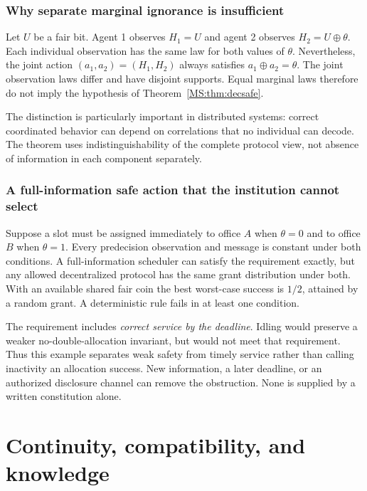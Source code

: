 \subsection{Why separate marginal ignorance is insufficient}
\begin{MScounterexample}\label{MS:ex:jointviews}
Let $U$ be a fair bit. Agent 1 observes $H_1=U$ and agent 2 observes $H_2=U\oplus\theta$. Each individual observation has the same law for both values of $\theta$. Nevertheless, the joint action $(a_1,a_2)=(H_1,H_2)$ always satisfies $a_1\oplus a_2=\theta$. The joint observation laws differ and have disjoint supports. Equal marginal laws therefore do not imply the hypothesis of Theorem~\ref{MS:thm:decsafe}.
\end{MScounterexample}

The distinction is particularly important in distributed systems: correct coordinated behavior can depend on correlations that no individual can decode. The theorem uses indistinguishability of the complete protocol view, not absence of information in each component separately.

\subsection{A full-information safe action that the institution cannot select}
Suppose a slot must be assigned immediately to office $A$ when $\theta=0$ and to office $B$ when $\theta=1$. Every predecision observation and message is constant under both conditions. A full-information scheduler can satisfy the requirement exactly, but any allowed decentralized protocol has the same grant distribution under both. With an available shared fair coin the best worst-case success is $1/2$, attained by a random grant. A deterministic rule fails in at least one condition.

The requirement includes \emph{correct service by the deadline}. Idling would preserve a weaker no-double-allocation invariant, but would not meet that requirement. Thus this example separates weak safety from timely service rather than calling inactivity an allocation success. New information, a later deadline, or an authorized disclosure channel can remove the obstruction. None is supplied by a written constitution alone.



\chapter{Continuity, compatibility, and knowledge}\label{MS:book:chapter-95}

